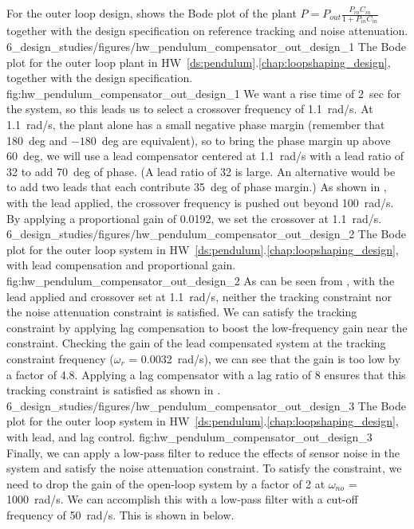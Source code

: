 For the outer loop design,  shows the Bode plot of the plant $P=P_{out}\frac{P_{in}C_{in}}{1+P_{in}C_{in}}$ together with the design specification on reference tracking and noise attenuation.  
%
	{6_design_studies/figures/hw_pendulum_compensator_out_design_1}
	{The Bode plot for the outer loop plant in HW~\ref{ds:pendulum}.\ref{chap:loopshaping_design}, together with the design specification.}
	{fig:hw_pendulum_compensator_out_design_1}
We want a rise time of 2~sec for the system, so this leads us to select a crossover frequency of 1.1~rad/s. At 1.1~rad/s, the plant alone has a small negative phase margin (remember that 180~deg and $-180$~deg are equivalent), so to bring the phase margin up above 60~deg, we will use a lead compensator centered at 1.1~rad/s with a lead ratio of 32 to add 70~deg of phase. (A lead ratio of 32 is large. An alternative would be to add two leads that each contribute 35~deg of phase margin.) As shown in , with the lead applied, the crossover frequency is pushed out beyond 100~rad/s. By applying a proportional gain of 0.0192, we set the crossover at 1.1~rad/s.
	{6_design_studies/figures/hw_pendulum_compensator_out_design_2}
	{The Bode plot for the outer loop system in HW~\ref{ds:pendulum}.\ref{chap:loopshaping_design}, with lead compensation and proportional gain.}
	{fig:hw_pendulum_compensator_out_design_2}
As can be seen from , with the lead applied and crossover set at 1.1~rad/s, neither the tracking constraint nor the noise attenuation constraint is satisfied. We can satisfy the tracking constraint by applying lag compensation to boost the low-frequency gain near the constraint. Checking the gain of the lead compensated system at the tracking constraint frequency ($\omega_r$ = 0.0032~rad/s), we can see that the gain is too low by a factor of 4.8. Applying a lag compensator with a lag ratio of 8 ensures that this tracking constraint is satisfied as shown in .
%
	{6_design_studies/figures/hw_pendulum_compensator_out_design_3}
	{The Bode plot for the outer loop system in HW~\ref{ds:pendulum}.\ref{chap:loopshaping_design}, with lead, and lag control.}
	{fig:hw_pendulum_compensator_out_design_3}
%
Finally, we can apply a low-pass filter to reduce the effects of sensor noise in the system and satisfy the noise attenuation constraint. To satisfy the constraint, we need to drop the gain of the open-loop system by a factor of 2 at $\omega_{no}$ = 1000~rad/s. We can accomplish this with a low-pass filter with a cut-off frequency of 50~rad/s. This is shown in  below.
